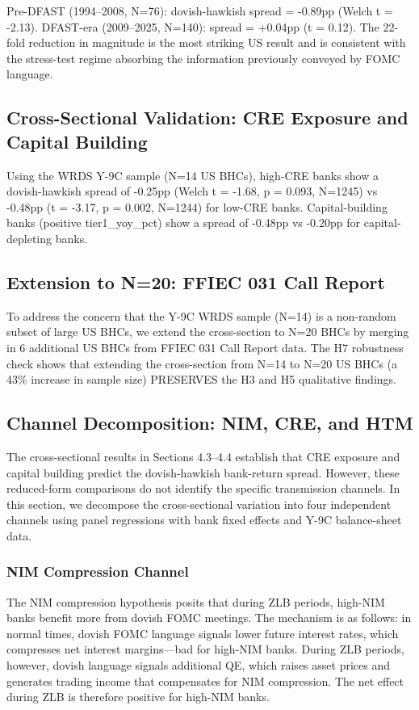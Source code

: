 \documentclass[12pt,a4paper]{article}
\begin{document}
Pre-DFAST (1994–2008, N=76): dovish-hawkish spread = -0.89pp (Welch t = -2.13). DFAST-era (2009–2025, N=140): spread = +0.04pp (t = 0.12). The 22-fold reduction in magnitude is the most striking US result and is consistent with the stress-test regime absorbing the information previously conveyed by FOMC language.

\subsection{Cross-Sectional Validation: CRE Exposure and Capital Building}

Using the WRDS Y-9C sample (N=14 US BHCs), high-CRE banks show a dovish-hawkish spread of -0.25pp (Welch t = -1.68, p = 0.093, N=1245) vs -0.48pp (t = -3.17, p = 0.002, N=1244) for low-CRE banks. Capital-building banks (positive tier1\_yoy\_pct) show a spread of -0.48pp vs -0.20pp for capital-depleting banks.

\subsection{Extension to N=20: FFIEC 031 Call Report}

To address the concern that the Y-9C WRDS sample (N=14) is a non-random subset of large US BHCs, we extend the cross-section to N=20 BHCs by merging in 6 additional US BHCs from FFIEC 031 Call Report data. The H7 robustness check shows that extending the cross-section from N=14 to N=20 US BHCs (a 43\% increase in sample size) PRESERVES the H3 and H5 qualitative findings.

\subsection{Channel Decomposition: NIM, CRE, and HTM}

The cross-sectional results in Sections 4.3–4.4 establish that CRE exposure and capital building predict the dovish-hawkish bank-return spread. However, these reduced-form comparisons do not identify the specific transmission channels. In this section, we decompose the cross-sectional variation into four independent channels using panel regressions with bank fixed effects and Y-9C balance-sheet data.

\subsubsection{NIM Compression Channel}

The NIM compression hypothesis posits that during ZLB periods, high-NIM banks benefit more from dovish FOMC meetings. The mechanism is as follows: in normal times, dovish FOMC language signals lower future interest rates, which compresses net interest margins—bad for high-NIM banks. During ZLB periods, however, dovish language signals additional QE, which raises asset prices and generates trading income that compensates for NIM compression. The net effect during ZLB is therefore positive for high-NIM banks.
\end{document}
